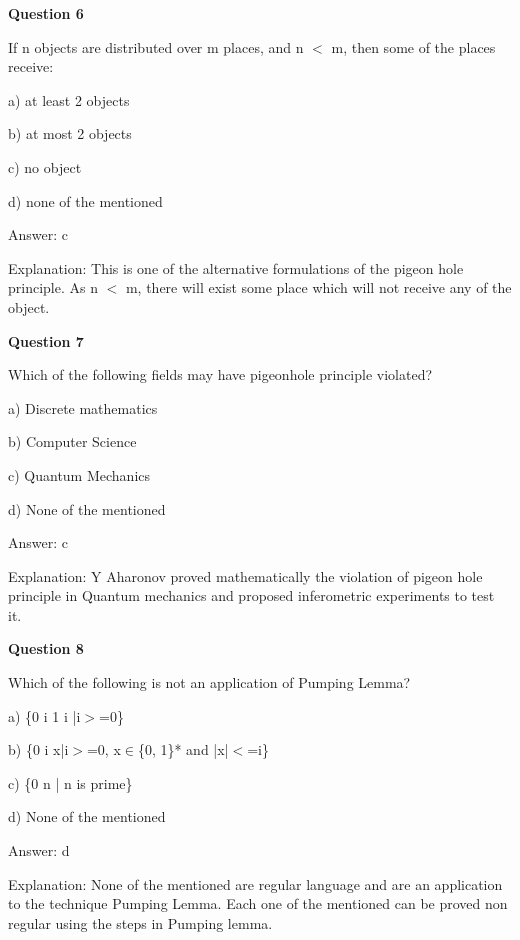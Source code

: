 \documentclass{article}
\begin{document}
\begin{mdframed}[linewidth=1pt, roundcorner=5pt, linecolor=gray!30, backgroundcolor=gray!5]
\textbf{Question 6} 

If n objects are distributed over m places, and n $<$ m, then some of the places receive:

a) at least 2 objects

b) at most 2 objects

c) no object

d) none of the mentioned
\vspace{5pt} \par
\begin{tcolorbox}[colback=green!5, colframe=green!40!black, title=Solution]
Answer: c

Explanation: This is one of the alternative formulations of the pigeon hole principle. As n $<$ m, there will exist some place which will not receive any of the object.
\end{tcolorbox}
\end{mdframed}
\newpage

\begin{mdframed}[linewidth=1pt, roundcorner=5pt, linecolor=gray!30, backgroundcolor=gray!5]
\textbf{Question 7} 

Which of the following fields may have pigeonhole principle violated?

a) Discrete mathematics

b) Computer Science

c) Quantum Mechanics

d) None of the mentioned
\vspace{5pt} \par
\begin{tcolorbox}[colback=green!5, colframe=green!40!black, title=Solution]
Answer: c

Explanation: Y Aharonov proved mathematically the violation of pigeon hole principle in Quantum mechanics and proposed inferometric experiments to test it.
\end{tcolorbox}
\end{mdframed}

\begin{mdframed}[linewidth=1pt, roundcorner=5pt, linecolor=gray!30, backgroundcolor=gray!5]
\textbf{Question 8} 

Which of the following is not an application of Pumping Lemma?

a) \{0
i
1
i
|i$>$=0\}

b) \{0
i
x|i$>$=0, x$\in$\{0, 1\}* and |x|$<$=i\}

c) \{0
n
| n is prime\}

d) None of the mentioned
\vspace{5pt} \par
\begin{tcolorbox}[colback=green!5, colframe=green!40!black, title=Solution]
Answer: d

Explanation: None of the mentioned are regular language and are an application to the technique Pumping Lemma. Each one of the mentioned can be proved non regular using the steps in Pumping lemma.
\end{tcolorbox}
\end{mdframed}
\end{document}
